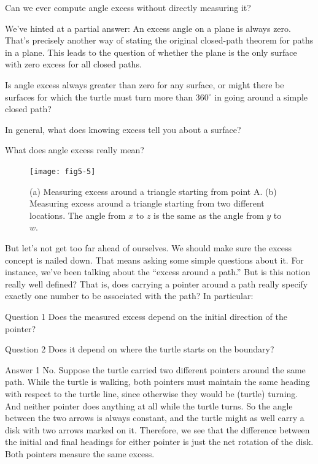 \documentclass{book}
\begin{document}
Can we ever compute angle excess without directly measuring it?

We've hinted at a partial answer: An excess angle on a plane is always
zero. That's precisely another way of stating the original closed-path
theorem for paths in a plane. This leads to the question of whether the
plane is the only surface with zero excess for all closed paths.

Is angle excess always greater than zero for any surface, or might there be surfaces for which the turtle must turn more than $360^{\circ}$ in going
around a simple closed path?

In general, what does knowing excess tell you about a surface?

What does angle excess really mean?

\begin{figure}
\begin{center}
\texttt{[image: fig5-5]}
\caption{(a) Measuring excess around a triangle starting from point A. (b) Measuring excess around a triangle starting from two different locations. The angle from $x$ to $z$ is the same as the angle from $y$ to $w$.}
\end{center}
\end{figure}

But let's not get too far ahead of ourselves. We should make sure the
excess concept is nailed down. That means asking some simple questions
about it. For instance, we've been talking about the ``excess around a
path.'' But is this notion really well defined? That is, does carrying a
pointer around a path really specify exactly one number to be associated
with the path? In particular:

Question 1 Does the measured excess depend on the initial direction of
the pointer?

Question 2 Does it depend on where the turtle starts on the boundary?

Answer 1 No. Suppose the turtle carried two different pointers around
the same path. While the turtle is walking, both pointers must maintain
the same heading with respect to the turtle line, since otherwise they
would be (turtle) turning. And neither pointer does anything at all while
the turtle turns. So the angle between the two arrows is always constant,
and the turtle might as well carry a disk with two arrows marked on
it. Therefore, we see that the difference between the initial and final
headings for either pointer is just the net rotation of the disk. Both
pointers measure the same excess.
\end{document}

